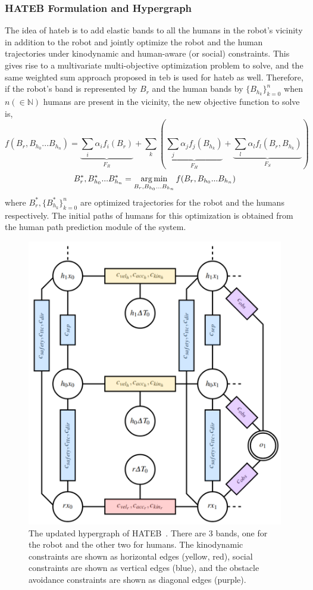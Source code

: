 \subsubsection{HATEB Formulation and Hypergraph}
The idea of \acrshort{hateb} is to add elastic bands to all the humans in the robot's vicinity in addition to the robot and jointly optimize the robot and the human trajectories under kinodynamic and human-aware (or social) constraints. This gives rise to a multivariate multi-objective optimization problem to solve, and the same weighted sum approach proposed in \acrshort{teb} is used for \acrshort{hateb} as well. Therefore, if the robot's band is represented by $B_r$ and the human bands by $\{B_{h_k}\}_{k=0}^n$ when $n (\in \mathbb{N})$ humans are present in the vicinity, the new objective function to solve is,
\begin{equation}
    \label{hateb_eq}
    f(B_r, B_{h_0}...B_{h_n}) = \underbrace{\sum_{i}\alpha_i f_i(B_r)}_{F_R} + \sum_k \left (\underbrace{\sum_{j}\alpha_j f_j(B_{h_k})}_{F_H} + \underbrace{\sum_l \alpha_l f_l(B_r, B_{h_k})}_{F_S} \right )
\end{equation}
\begin{equation}
    B_r^*, B_{h_0}^*...B_{h_n}^* = \argmin_{B_r, B_{h_0}...B_{h_n}} f(B_r, B_{h_0}...B_{h_n})
\end{equation}
where $B_r^*, \{B_{h_k}^*\}_{k=0}^n$ are optimized trajectories for the robot and the humans respectively. The initial paths of humans for this optimization is obtained from the human path prediction module of the system.
\begin{figure}[!h]
    \centering
    \includegraphics[width=0.65\columnwidth]{images/hateb_new.pdf}
    \caption{The updated hypergraph of HATEB~\cite{khambhaita2017viewing}. There are 3 bands, one for the robot and the other two for humans. The kinodynamic constraints are shown as horizontal edges (yellow, red), social constraints are shown as vertical edges (blue), and the obstacle avoidance constraints are shown as diagonal edges (purple).}
    \label{fig:hateb_hypergraph}
\end{figure}

